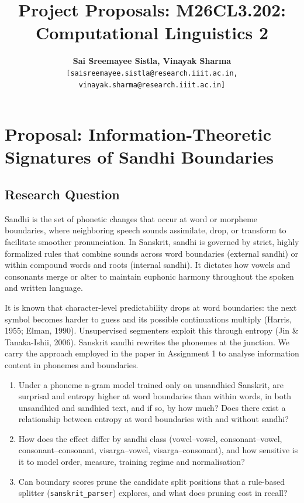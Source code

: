\documentclass[11pt,a4paper]{article}
\author{\small \textbf{Sai Sreemayee Sistla, Vinayak Sharma} \\ \quad\quad \texttt{[saisreemayee.sistla@research.iiit.ac.in, vinayak.sharma@research.iiit.ac.in]}}
\title{\vspace{-1.5em}\textbf{Project Proposals: M26CL3.202: Computational Linguistics 2}\vspace{-0.5em}}
\date{\vspace{-1.5em}}
\begin{document}
\maketitle
\vspace{-1.5em}

\section{Proposal:  Information-Theoretic Signatures of Sandhi Boundaries}

\subsection{Research Question}
Sandhi is the set of phonetic changes that occur at word or morpheme boundaries, where neighboring speech sounds assimilate, drop, or transform to facilitate smoother pronunciation. In Sanskrit, sandhi is governed by strict, highly formalized rules that combine sounds across word boundaries (external sandhi) or within compound words and roots (internal sandhi). It dictates how vowels and consonants merge or alter to maintain euphonic harmony throughout the spoken and written language.

It is known that character-level predictability drops at word boundaries: the next symbol becomes harder to guess and its possible continuations multiply (Harris, 1955; Elman, 1990). Unsupervised segmenters exploit this through entropy (Jin & Tanaka-Ishii, 2006). Sanskrit sandhi rewrites the phonemes at the junction. We carry the approach employed in the paper in Assignment 1 to analyse information content in phonemes and boundaries.

\begin{enumerate}
    \item Under a phoneme n-gram model trained only on unsandhied Sanskrit, are surprisal and entropy higher at word boundaries than within words, in both unsandhied and sandhied text, and if so, by how much? Does there exist a relationship between entropy at word boundaries with and without sandhi?
    \item How does the effect differ by sandhi class (vowel–vowel, consonant–vowel, consonant–consonant, visarga–vowel, visarga–consonant), and how sensitive is it to model order, measure, training regime and normalisation?
    \item Can boundary scores prune the candidate split positions that a rule-based splitter (\texttt{sanskrit\_parser}) explores, and what does pruning cost in recall?
\end{enumerate}
\end{document}

